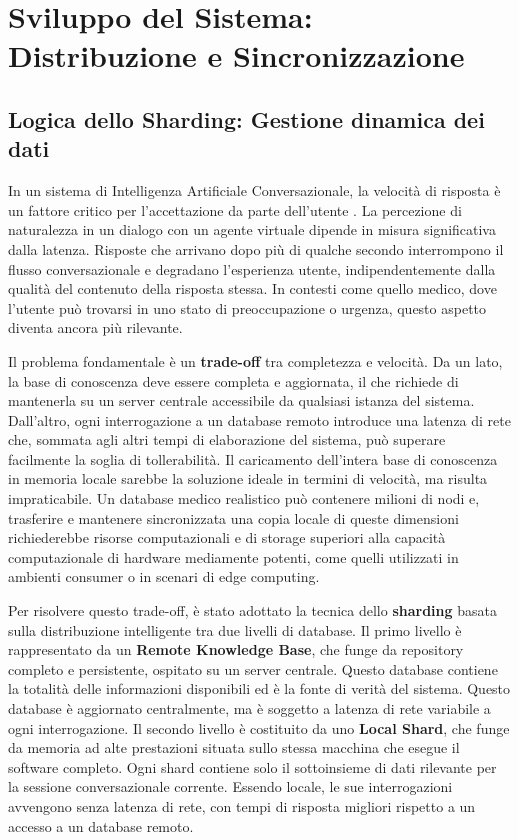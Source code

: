 \newpage\pagestyle{main}

\chapter{Sviluppo del Sistema: Distribuzione e Sincronizzazione}\label{chap:third}

\inlineminitoc

\section{Logica dello Sharding: Gestione dinamica dei dati}

In un sistema di Intelligenza Artificiale Conversazionale, la velocità di risposta è un fattore critico per l'accettazione da parte dell'utente \cite{latency_eca}. La percezione di naturalezza in un dialogo con un agente virtuale dipende in misura significativa dalla latenza. Risposte che arrivano dopo più di qualche secondo interrompono il flusso conversazionale e degradano l'esperienza utente, indipendentemente dalla qualità del contenuto della risposta stessa. In contesti come quello medico, dove l'utente può trovarsi in uno stato di preoccupazione o urgenza, questo aspetto diventa ancora più rilevante.

Il problema fondamentale è un \textbf{trade-off} tra completezza e velocità. Da un lato, la base di conoscenza deve essere completa e aggiornata, il che richiede di mantenerla su un server centrale accessibile da qualsiasi istanza del sistema. Dall'altro, ogni interrogazione a un database remoto introduce una latenza di rete che, sommata agli altri tempi di elaborazione del sistema, può superare facilmente la soglia di tollerabilità. Il caricamento dell'intera base di conoscenza in memoria locale sarebbe la soluzione ideale in termini di velocità, ma risulta impraticabile. Un database medico realistico può contenere milioni di nodi e, trasferire e mantenere sincronizzata una copia locale di queste dimensioni richiederebbe risorse computazionali e di storage superiori alla capacità computazionale di hardware mediamente potenti, come quelli utilizzati in ambienti consumer o in scenari di edge computing.

Per risolvere questo trade-off, è stato adottato la tecnica dello \textbf{sharding} basata sulla distribuzione intelligente tra due livelli di database. Il primo livello è rappresentato da un \textbf{Remote Knowledge Base}, che funge da repository completo e persistente, ospitato su un server centrale. Questo database contiene la totalità delle informazioni disponibili ed è la fonte di verità del sistema. Questo database è aggiornato centralmente, ma è soggetto a latenza di rete variabile a ogni interrogazione. Il secondo livello è costituito da uno \textbf{Local Shard}, che funge da memoria ad alte prestazioni situata sullo stessa macchina che esegue il software completo. Ogni shard contiene solo il sottoinsieme di dati rilevante per la sessione conversazionale corrente. Essendo locale, le sue interrogazioni avvengono senza latenza di rete, con tempi di risposta migliori rispetto a un accesso a un database remoto.

